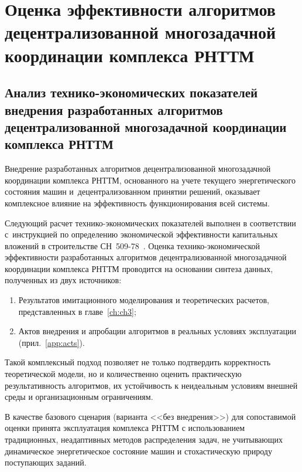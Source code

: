 \chapter{Оценка эффективности алгоритмов децентрализованной многозадачной координации комплекса РНТТМ}\label{ch:ch4}

\section{Анализ технико-экономических показателей внедрения разработанных алгоритмов децентрализованной многозадачной координации комплекса РНТТМ}\label{sec:ch4/sec1}

Внедрение разработанных алгоритмов децентрализованной многозадачной координации комплекса РНТТМ, основанного на учете текущего энергетического состояния машин и~децентрализованном принятии решений, оказывает комплексное влияние на эффективность функционирования всей системы.

Следующий расчет технико-экономических показателей выполнен в соответствии с~инструкцией по определению экономической эффективности капитальных вложений в строительстве СН~509-78~\cite{buildingTEP}. Оценка технико-экономической эффективности разработанных алгоритмов децентрализованной многозадачной координации комплекса РНТТМ проводится на основании синтеза данных, полученных из двух источников:

\begin{enumerate}[beginpenalty=10000, midpenalty=10000, wide=\parindent, leftmargin=0pt]
	\item Результатов имитационного моделирования и теоретических расчетов, представленных в главе~\ref{ch:ch3};

	\item Актов внедрения и апробации алгоритмов в реальных условиях эксплуатации (прил.~\ref{app:acts}).
\end{enumerate}

Такой комплексный подход позволяет не только подтвердить корректность теоретической модели, но и количественно оценить практическую результативность алгоритмов, их устойчивость к неидеальным условиям внешней среды и организационным ограничениям.

В качестве базового сценария (варианта <<без внедрения>>) для сопоставимой оценки принята эксплуатация комплекса РНТТМ с использованием традиционных, неадаптивных методов распределения задач, не учитывающих динамическое энергетическое состояние машин и стохастическую природу поступающих заданий.

